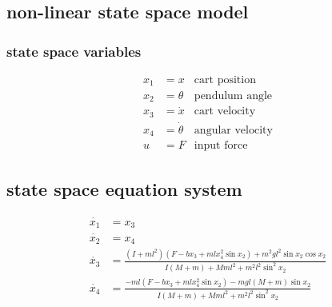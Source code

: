 \documentclass{ieeeaccess}
\begin{document}
\subsection{non-linear state space model}
\subsubsection{state space variables}
\begin{align*}
  x_1 &= x       & \text{cart position}    \\
  x_2 &= \theta       & \text{pendulum angle}   \\
  x_3 &= \dot{x} & \text{cart velocity}    \\
  x_4 &= \dot{\theta} & \text{angular velocity} \\
  u   &= F       & \text{input force}
\end{align*}
\subsection{state space equation system}
\begin{equation}
  \label{eq:NLM}
  \begin{aligned}
    \dot{x_1} &= x_3 \\
    \dot{x_2} &= x_4 \\
    \dot{x_3} &= \frac{(I + ml^2)(F - bx_3 + mlx_4^2\sin{x_2})
      + m^2gl^2\sin{x_2}\cos{x_2}}{I(M + m) + Mml^2 + m^2l^2\sin^2{x_2}} \\
    \dot{x_4} &= \frac{-ml(F - bx_3 + mlx_4^2\sin{x_2}) - mgl(M + m)\sin{x_2}}
       {I(M + m) + Mml^2 + m^2l^2\sin^2{x_2}}
  \end{aligned}
\end{equation}
\end{document}
